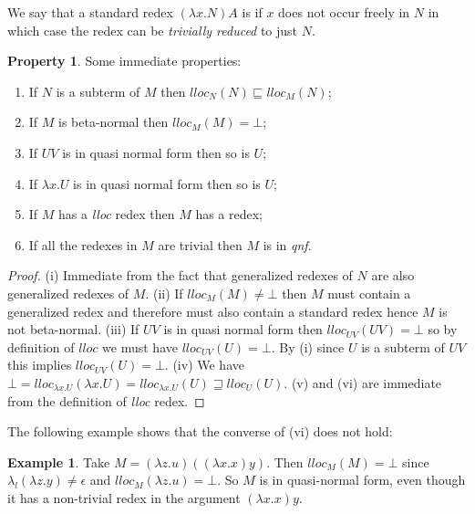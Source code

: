 \documentclass{elsarticle}
\theoremstyle{plain}
\theoremstyle{definition}
\newtheorem{property}{Property}[section]
\newtheorem{example}{Example}[section]
\theoremstyle{remark}
\begin{document}
We say that a standard redex $(\lambda x. N) A$ is  if $x$ does not occur freely in $N$ in which case the redex can be \emph{trivially reduced} to just $N$.

\begin{property}
\label{prop:lloc_properties}
Some immediate properties:
\begin{enumerate}[noitemsep,label=(\roman*)]
\item
 If $N$ is a subterm of $M$ then $lloc_N(N) \sqsubseteq lloc_M(N)$;
\item
 If $M$ is beta-normal then $lloc_M(M) = \bot$;
 \item
 If $U V$ is in quasi normal form then so is $U$;
\item
 If $\lambda x . U$ is in quasi normal form then so is $U$;
 \item If $M$ has a \emph{lloc} redex then $M$ has a redex;
 \item If all the redexes in $M$ are trivial then $M$ is in \emph{qnf}.
\end{enumerate}
\end{property}
\begin{proof}
(i) Immediate from the fact that generalized redexes of $N$ are also generalized redexes of $M$. (ii) If $lloc_M(M) \neq \bot$ then $M$ must contain a generalized redex and therefore must also contain a standard redex hence $M$ is not beta-normal.
(iii) If $U V$ is in quasi normal form then $lloc_{UV}(UV) = \bot$ so by definition of $lloc$ we must have $lloc_{UV}(U) = \bot$. By (i) since $U$ is a subterm of $UV$ this implies $lloc_{UV}(U) = \bot$.
(iv) We have $\bot = lloc_{\lambda x . U}(\lambda x . U) = lloc_{\lambda x . U}(U) \sqsupseteq lloc_{U}(U)$.
(v) and (vi) are immediate from the definition of \emph{lloc} redex.
\end{proof}

The following example shows that the converse of (vi) does not hold:
\begin{example}
Take $M= (\lambda z.u)((\lambda x . x) y)$. Then $lloc_M(M) = \bot$ since $\lambda_l(\lambda z.y)\ne\epsilon$ and $lloc_M(\lambda z.u) = \bot$.
So $M$ is in quasi-normal form, even though it has a non-trivial redex in the argument $(\lambda x . x) y$.
\end{example}
\end{document}
